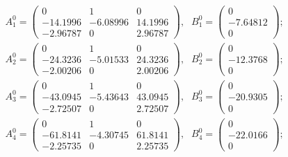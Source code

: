 \begin{equation*}
\begin{array}{lr}


A_1^0 = \left(\begin{array}{ccc}
0    &    1    &    0 \\
-14.1996    &    -6.08996    &    14.1996 \\
-2.96787    &    0    &    2.96787
\end{array}\right)\mbox{,} &
B_1^0 = \left(\begin{array}{c}
0 \\
-7.64812 \\
0
\end{array}\right)\mbox{;} \\

A_2^0 = \left(\begin{array}{ccc}
0    &    1    &    0 \\
-24.3236    &    -5.01533    &    24.3236 \\
-2.00206    &    0    &    2.00206
\end{array}\right)\mbox{,} &
B_2^0 = \left(\begin{array}{c}
0 \\
-12.3768 \\
0
\end{array}\right)\mbox{;} \\

A_3^0 = \left(\begin{array}{ccc}
0    &    1    &    0 \\
-43.0945    &    -5.43643    &    43.0945 \\
-2.72507    &    0    &    2.72507
\end{array}\right)\mbox{,} &
B_3^0 = \left(\begin{array}{c}
0 \\
-20.9305 \\
0
\end{array}\right)\mbox{;} \\

A_4^0 = \left(\begin{array}{ccc}
0    &    1    &    0 \\
-61.8141    &    -4.30745    &    61.8141 \\
-2.25735    &    0    &    2.25735
\end{array}\right)\mbox{,} &
B_4^0 = \left(\begin{array}{c}
0 \\
-22.0166 \\
0
\end{array}\right)\mbox{;} \\


\end{array}
\end{equation*}
